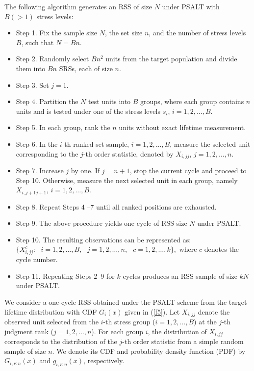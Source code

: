 \documentclass[twoside]{article}
\begin{document}
\begin{alg}\label{alg1}
The following algorithm generates an RSS of size $N$ under PSALT with $B(>1)$ stress levels:

\begin{itemize}
\item
Step 1. Fix the sample size $N$, the set size $n$, and the number of stress levels $B$, such that $N=Bn$.

\item
Step 2. Randomly select $Bn^2$ units from the target population and divide them into $Bn$ SRSs, each of size $n$.

\item
Step 3. Set $j=1$.

\item
Step 4. Partition the $N$ test units into $B$ groups, where each group contains $n$ units and is tested under one of the stress levels $s_i$, $i=1,2,\dots,B$.

\item
Step 5. In each group, rank the $n$ units without exact lifetime measurement.

\item
Step 6. In the $i$-th ranked set sample, $i=1,2,\dots,B$, measure the selected unit corresponding to the $j$-th order statistic, denoted by ${X_{i,jj}}$, $j=1,2,\dots,n$.

\item
Step 7. Increase $j$ by one. If $j=n+1$, stop the current cycle and proceed to Step 10. Otherwise, measure the next selected unit in each group, namely ${X_{i,j+1j+1}}$, $i=1,2,\dots,B$.
 
\item
Step 8. Repeat Steps 4 –7 until all ranked positions are exhausted.
 
\item
Step 9. The above procedure yields one cycle of RSS size $N$ under PSALT.

\item
Step 10. The resulting observations can be represented as:
$
\{ X_{i,jj}^c: \,\,\,\, i=1,2,\dots,B,\,\,\,\, j=1,2,\dots,n, \,\,\,\ c=1,2,\dots,k \},
$
where $c$ denotes the cycle number.

\item
Step 11. Repeating Steps 2–9 for $k$ cycles produces an RSS sample of size $kN$ under PSALT.
\end{itemize}
\end{alg}


We consider a one‑cycle RSS obtained under the PSALT scheme from the target lifetime distribution with CDF 
$G_i(x)$ given in (\ref{f5}). Let $X_{i,jj}$ denote the observed unit selected from the $i$-th stress group ($i=1,2,\dots,B$) at the $j$-th judgment rank ($j=1,2,\dots,n$). For each group $i$, the distribution of $X_{i,jj}$ corresponds to the distribution of the $j$-th order statistic from a simple random sample of size $n$. We denote its CDF and probability density function (PDF) by $G_{i,r:n}(x)$ and $g_{i,r:n}(x)$, respectively.
\end{document}
